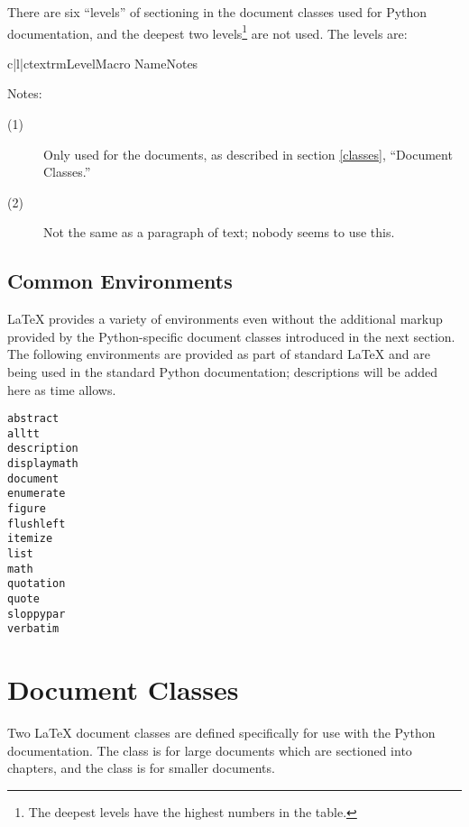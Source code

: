 \documentclass{howto}
\begin{document}
    There are six ``levels'' of sectioning in the document classes
    used for Python documentation, and the deepest two
    levels\footnote{The deepest levels have the highest numbers in the
      table.} are not used.  The levels are:

      \begin{tableiii}{c|l|c}{textrm}{Level}{Macro Name}{Notes}
      \end{tableiii}

    \noindent
    Notes:

    \begin{description}
      \item[(1)]
      Only used for the  documents, as described in
      section \ref{classes}, ``Document Classes.''
      \item[(2)]
      Not the same as a paragraph of text; nobody seems to use this.
    \end{description}


  \subsection{Common Environments \label{latex-environments}}

    \LaTeX{} provides a variety of environments even without the
    additional markup provided by the Python-specific document classes
    introduced in the next section.  The following environments are
    provided as part of standard \LaTeX{} and are being used in the
    standard Python documentation; descriptions will be added here as
    time allows.

\begin{verbatim}
abstract
alltt
description
displaymath
document
enumerate
figure
flushleft
itemize
list
math
quotation
quote
sloppypar
verbatim
\end{verbatim}


\section{Document Classes \label{classes}}

  Two \LaTeX{} document classes are defined specifically for use with
  the Python documentation.  The  class is for large
  documents which are sectioned into chapters, and the 
  class is for smaller documents.
\end{document}
